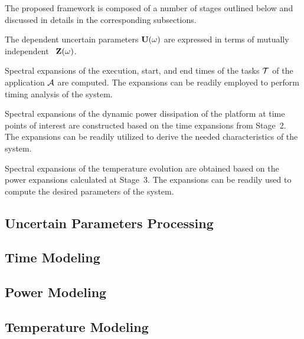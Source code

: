 The proposed framework is composed of a number of stages outlined below and discussed in details in the corresponding subsections.

 The dependent uncertain parameters $\mathbf{U}(\omega)$ are expressed in terms of mutually independent \rvs\ $\mathbf{Z}(\omega)$.

 Spectral expansions of the execution, start, and end times of the tasks $\mathcal{T}$ of the application $\mathcal{A}$ are computed. The expansions can be readily employed to perform timing analysis of the system.

 Spectral expansions of the dynamic power dissipation of the platform at time points of interest are constructed based on the time expansions from Stage~2. The expansions can be readily utilized to derive the needed characteristics of the system.

 Spectral expansions of the temperature evolution are obtained based on the power expansions calculated at Stage~3. The expansions can be readily used to compute the desired parameters of the system.

\subsection{Uncertain Parameters Processing} 


\subsection{Time Modeling} 


\subsection{Power Modeling} 


\subsection{Temperature Modeling} 

